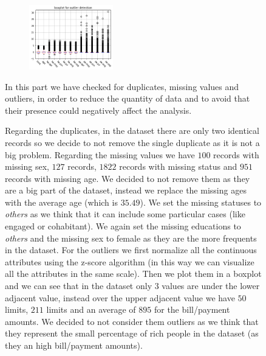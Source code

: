 \begin{figure}[h]
  \begin{minipage}[h]{0.95\textwidth}

\begin{figure}
\centering
\includegraphics[width=0.40\textwidth]{img/ch2/outlier}
\end{figure}

    In this part we have checked for duplicates, missing values and outliers, in order to reduce the quantity of data and to avoid that their presence could negatively affect the analysis.

    Regarding the duplicates, in the dataset there are only two identical records so we decide to not remove the single duplicate as it is not a big problem.
    Regarding the missing values we have $100$ records with missing sex, $127$ records, $1822$ records with missing status and $951$ records with missing age. We decided to not remove them as they are a big part of the dataset, instead we replace the missing ages with the average age (which is $35.49$). We set the missing statuses to \textit{others} as we think that it can include some particular cases (like engaged or cohabitant). We again set the missing educations to \textit{others} and the missing sex to female as they are the more frequents in the dataset. 
    For the outliers we first normalize all the continuous attributes using the z-score algorithm (in this way we can visualize all the attributes in the same scale). Then we plot them in a boxplot and we can see that in the dataset only $3$ values are under the lower adjacent value, instead over the upper adjacent value we have $50$ limits, $211$ limits and an average of $895$ for the bill/payment amounts. We decided to not consider them outliers as we think that they represent the small percentage of rich people in the dataset (as they an high bill/payment amounts).
  \end{minipage}
\end{figure}

